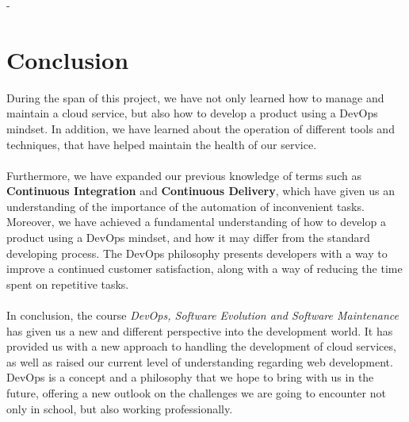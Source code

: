 -\section{Conclusion}
\label{sec:mpt}
During the span of this project, we have not only learned how to manage and maintain a cloud service, but also how to develop a product using a DevOps mindset. In addition, we have learned about the operation of different tools and techniques, that have helped maintain the health of our service. 
\\\\
Furthermore, we have expanded our previous knowledge of terms such as \textbf{Continuous Integration} and \textbf{Continuous Delivery}, which have given us an understanding of the importance of the automation of inconvenient tasks. Moreover, we have achieved a fundamental understanding of how to develop a product using a DevOps mindset, and how it may differ from the standard developing process. The DevOps philosophy presents developers with a way to improve a continued customer satisfaction, along with a way of reducing the time spent on repetitive tasks. 
\\\\
In conclusion, the course \textit{DevOps, Software Evolution and Software Maintenance} has given us a new and different perspective into the development world. It has provided us with a new approach to handling the development of cloud services, as well as raised our current level of understanding regarding web development. DevOps is a concept and a philosophy that we hope to bring with us in the future, offering a new outlook on the challenges we are going to encounter not only in school, but also working professionally. 